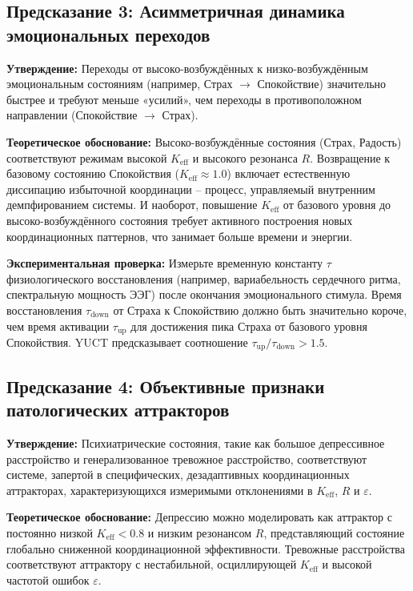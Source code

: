 \documentclass[12pt,a4paper]{article}
\begin{document}
	\subsection{Предсказание 3: Асимметричная динамика эмоциональных переходов}
	
	\textbf{Утверждение:} Переходы от высоко-возбуждённых к низко-возбуждённым эмоциональным состояниям (например, Страх \(\rightarrow\) Спокойствие) значительно быстрее и требуют меньше «усилий», чем переходы в противоположном направлении (Спокойствие \(\rightarrow\) Страх).
	
	\textbf{Теоретическое обоснование:} Высоко-возбуждённые состояния (Страх, Радость) соответствуют режимам высокой \(K_{\mathrm{eff}}\) и высокого резонанса \(R\). Возвращение к базовому состоянию Спокойствия (\(K_{\mathrm{eff}} \approx 1.0\)) включает естественную диссипацию избыточной координации – процесс, управляемый внутренним демпфированием системы. И наоборот, повышение \(K_{\mathrm{eff}}\) от базового уровня до высоко-возбуждённого состояния требует активного построения новых координационных паттернов, что занимает больше времени и энергии.
	
	\textbf{Экспериментальная проверка:} Измерьте временную константу \(\tau\) физиологического восстановления (например, вариабельность сердечного ритма, спектральную мощность ЭЭГ) после окончания эмоционального стимула. Время восстановления \(\tau_{\text{down}}\) от Страха к Спокойствию должно быть значительно короче, чем время активации \(\tau_{\text{up}}\) для достижения пика Страха от базового уровня Спокойствия. YUCT предсказывает соотношение \(\tau_{\text{up}}/\tau_{\text{down}} > 1.5\).
	
	\subsection{Предсказание 4: Объективные признаки патологических аттракторов}
	
	\textbf{Утверждение:} Психиатрические состояния, такие как большое депрессивное расстройство и генерализованное тревожное расстройство, соответствуют системе, запертой в специфических, дезадаптивных координационных аттракторах, характеризующихся измеримыми отклонениями в \(K_{\mathrm{eff}}\), \(R\) и \(\varepsilon\).
	
	\textbf{Теоретическое обоснование:} Депрессию можно моделировать как аттрактор с постоянно низкой \(K_{\mathrm{eff}} < 0.8\) и низким резонансом \(R\), представляющий состояние глобально сниженной координационной эффективности. Тревожные расстройства соответствуют аттрактору с нестабильной, осциллирующей \(K_{\mathrm{eff}}\) и высокой частотой ошибок \(\varepsilon\).
	
\end{document}
